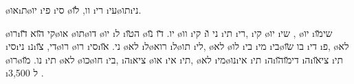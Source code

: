 \o{או}\i{ת}\o{יו}  \i{פי} \i{סי}  \o{וו}, \u{לו}  \i{רי} \i{עי}\o{תו}\i{ני}.

 \o{רו}\i{קי} \u{הוא}  \u{דו}\o{או} \o{תו}\o{דו} \o{יו} \i{ל}  \i{ה}\u{טו} \o{יו}. \u{דו} \u{נו} \o{וו} \i{קי} \i{ני} \u{ו} \i{תי} \i{רי},  \i{קי}  \o{יו}  \i{שי} ,  \o{יו}  \i{שי}\u{מו} \i{סי}\i{ני} \i{נ}\i{די},  \u{צו}\o{רו}   \o{רו} \i{סי}\i{ני}. \u{או}  \o{לא}  \i{ל}\o{רוא} \i{ל}\o{תו} \i{לי}, \o{לא}  \o{לו} \i{בי} \i{מי}  \i{בי}\o{בו} \u{שו} \i{די}  \i{פ},  \o{לא}  \o{רו}\o{נו}.   \u{מו} \i{תי} \o{לא}  \o{כו}\o{חו} \i{בי},  \i{ה}\i{ציא} \o{או} \i{אי}  \i{תי}, \o{לא}  \i{מי}\o{נו}\i{אי}  \i{תי} \i{ה}\i{די}\u{מו}\u{הו} \i{ה}\i{צי}\u{או}  \i{תי}  \i{ל} 3,500 .

